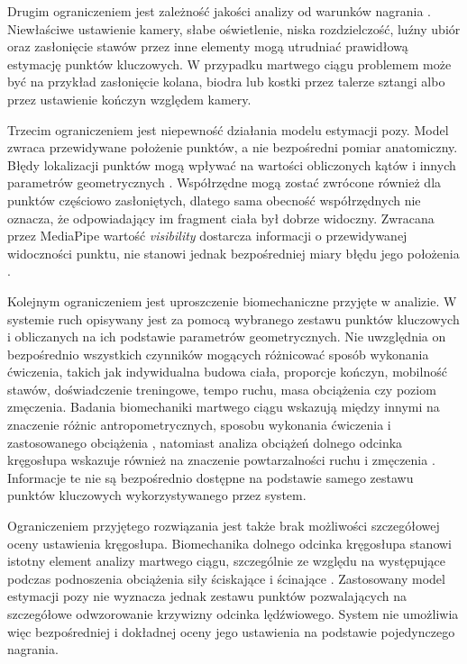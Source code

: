 Drugim ograniczeniem jest zależność jakości analizy od warunków nagrania \cite{wade2022markerless}. Niewłaściwe ustawienie kamery, słabe oświetlenie, niska rozdzielczość, luźny ubiór oraz zasłonięcie stawów przez inne elementy mogą utrudniać prawidłową estymację punktów kluczowych. W przypadku martwego ciągu problemem może być na przykład zasłonięcie kolana, biodra lub kostki przez talerze sztangi albo przez ustawienie kończyn względem kamery.

Trzecim ograniczeniem jest niepewność działania modelu estymacji pozy. Model zwraca przewidywane położenie punktów, a nie bezpośredni pomiar anatomiczny. Błędy lokalizacji punktów mogą wpływać na wartości obliczonych kątów i innych parametrów geometrycznych \cite{wade2022markerless}. Współrzędne mogą zostać zwrócone również dla punktów częściowo zasłoniętych, dlatego sama obecność współrzędnych nie oznacza, że odpowiadający im fragment ciała był dobrze widoczny. Zwracana przez MediaPipe wartość \textit{visibility} dostarcza informacji o przewidywanej widoczności punktu, nie stanowi jednak bezpośredniej miary błędu jego położenia \cite{mediapipe_pose_landmarker}.

Kolejnym ograniczeniem jest uproszczenie biomechaniczne przyjęte w analizie. W systemie ruch opisywany jest za pomocą wybranego zestawu punktów kluczowych i obliczanych na ich podstawie parametrów geometrycznych. Nie uwzględnia on bezpośrednio wszystkich czynników mogących różnicować sposób wykonania ćwiczenia, takich jak indywidualna budowa ciała, proporcje kończyn, mobilność stawów, doświadczenie treningowe, tempo ruchu, masa obciążenia czy poziom zmęczenia. Badania biomechaniki martwego ciągu wskazują między innymi na znaczenie różnic antropometrycznych, sposobu wykonania ćwiczenia i zastosowanego obciążenia \cite{hanen2025deadlift}, natomiast analiza obciążeń dolnego odcinka kręgosłupa wskazuje również na znaczenie powtarzalności ruchu i zmęczenia \cite{ramirez2022lowback}. Informacje te nie są bezpośrednio dostępne na podstawie samego zestawu punktów kluczowych wykorzystywanego przez system.

Ograniczeniem przyjętego rozwiązania jest także brak możliwości szczegółowej oceny ustawienia kręgosłupa. Biomechanika dolnego odcinka kręgosłupa stanowi istotny element analizy martwego ciągu, szczególnie ze względu na występujące podczas podnoszenia obciążenia siły ściskające i ścinające \cite{ramirez2022lowback}. Zastosowany model estymacji pozy nie wyznacza jednak zestawu punktów pozwalających na szczegółowe odwzorowanie krzywizny odcinka lędźwiowego. System nie umożliwia więc bezpośredniej i dokładnej oceny jego ustawienia na podstawie pojedynczego nagrania.

